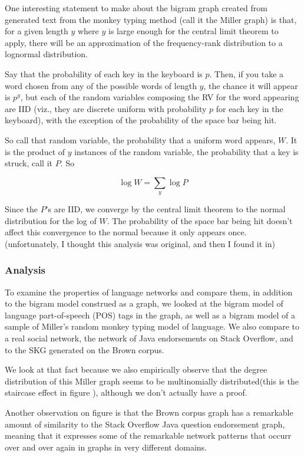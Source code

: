 \documentclass[12pt]{article}
\begin{document}
One interesting statement to make about the bigram graph created from generated text from the monkey typing method (call it the Miller graph) is that, for a given length $y$ where $y$ is large enough for the central limit theorem to apply, there will be an approximation of the frequency-rank distribution to a lognormal distribution.

Say that the probability of each key in the keyboard is $p$. Then, if you take a word chosen from any of the possible words of length $y$, the chance it will appear is $p^y$, but each of the random variables composing the RV for the word appearing are IID (viz., they are discrete uniform with probability $p$ for each key in the keyboard), with the exception of the probability of the space bar being hit.

So call that random variable, the probability that a uniform word appears, $W$. It is the product of $y$ instances of the random variable, the probability that a key is struck, call it $P$. So

$$ \log W = \sum_y \log P $$

Since the $P$'s are IID, we converge by the central limit theorem to the normal distribution for the log of $W$. The probability of the space bar being hit doesn't affect this convergence to the normal because it only appears once. (unfortunately, I thought this analysis was original, and then I found it in) %

\subsubsection*{Analysis}

To examine the properties of language networks and compare them, in addition to the bigram model construed as a graph, we looked at the bigram model of language part-of-speech (POS) tags in the graph, as well as a bigram model of a sample of Miller's random monkey typing model of language. We also compare to a real social network, the network of Java endorsements on Stack Overflow, and to the SKG generated on the Brown corpus.%

We look at that fact because we also empirically observe that the degree distribution of this Miller graph seems to be multinomially distributed(this is the staircase effect in figure \label{fig:plots}), although we don't actually have a proof.

Another observation on figure \label{fig:plots} is that the Brown corpus graph has a remarkable amount of similarity to the Stack Overflow Java question endorsement graph, meaning that it expresses some of the remarkable network patterns that occurr over and over again in graphs in very different domains. %
\end{document}
